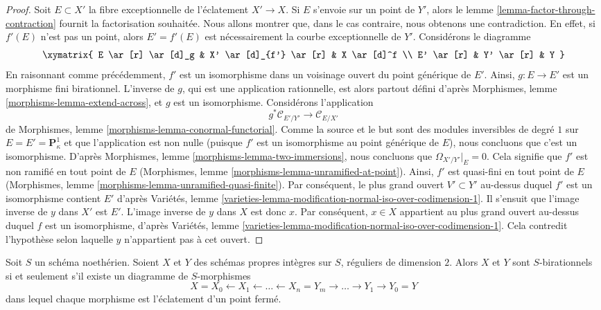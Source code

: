 \begin{proof}
\medskip\noindent Soit $E \subset X'$ la fibre exceptionnelle de l'éclatement $X' \to X$. Si $E$ s'envoie sur un point de $Y'$, alors le lemme \ref{lemma-factor-through-contraction} fournit la factorisation souhaitée. Nous allons montrer que, dans le cas contraire, nous obtenons une contradiction. En effet, si $f'(E)$ n'est pas un point, alors $E' = f'(E)$ est nécessairement la courbe exceptionnelle de $Y'$. Considérons le diagramme $$
\xymatrix{
E \ar[r] \ar[d]_g & X' \ar[d]_{f'} \ar[r] & X \ar[d]^f \\
E' \ar[r] & Y' \ar[r] & Y
}
$$ En raisonnant comme précédemment, $f'$ est un isomorphisme dans un voisinage ouvert du point générique de $E'$. Ainsi, $g : E \to E'$ est un morphisme fini birationnel. L'inverse de $g$, qui est une application rationnelle, est alors partout défini d'après Morphismes, lemme \ref{morphisms-lemma-extend-across}, et $g$ est un isomorphisme. Considérons l'application $$
g^*\mathcal{C}_{E'/Y'} \longrightarrow \mathcal{C}_{E/X'}
$$ de Morphismes, lemme \ref{morphisms-lemma-conormal-functorial}. Comme la source et le but sont des modules inversibles de degré $1$ sur $E = E' = \mathbf{P}^1_\kappa$ et que l'application est non nulle (puisque $f'$ est un isomorphisme au point générique de $E$), nous concluons que c'est un isomorphisme. D'après Morphismes, lemme \ref{morphisms-lemma-two-immersions}, nous concluons que $\Omega_{X'/Y'}|_E = 0$. Cela signifie que $f'$ est non ramifié en tout point de $E$ (Morphismes, lemme \ref{morphisms-lemma-unramified-at-point}). Ainsi, $f'$ est quasi-fini en tout point de $E$ (Morphismes, lemme \ref{morphisms-lemma-unramified-quasi-finite}). Par conséquent, le plus grand ouvert $V' \subset Y'$ au-dessus duquel $f'$ est un isomorphisme contient $E'$ d'après Variétés, lemme \ref{varieties-lemma-modification-normal-iso-over-codimension-1}. Il s'ensuit que l'image inverse de $y$ dans $X'$ est $E'$. L'image inverse de $y$ dans $X$ est donc $x$. Par conséquent, $x \in X$ appartient au plus grand ouvert au-dessus duquel $f$ est un isomorphisme, d'après Variétés, lemme \ref{varieties-lemma-modification-normal-iso-over-codimension-1}. Cela contredit l'hypothèse selon laquelle $y$ n'appartient pas à cet ouvert. \end{proof}

\begin{lemma} \label{lemma-birational-regular-surfaces} Soit $S$ un schéma noethérien. Soient $X$ et $Y$ des schémas propres intègres sur $S$, réguliers de dimension $2$. Alors $X$ et $Y$ sont $S$-birationnels si et seulement s'il existe un diagramme de $S$-morphismes $$
X = X_0 \leftarrow X_1 \leftarrow \ldots \leftarrow X_n = Y_m
\to \ldots \to Y_1 \to Y_0 = Y
$$ dans lequel chaque morphisme est l'éclatement d'un point fermé. \end{lemma}

